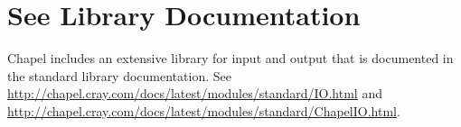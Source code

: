 \label{Input_and_Output}

\section{See Library Documentation}

Chapel includes an extensive library for input and output that is
documented in the standard library documentation. See
\url{http://chapel.cray.com/docs/latest/modules/standard/IO.html}
and
\url{http://chapel.cray.com/docs/latest/modules/standard/ChapelIO.html}.

